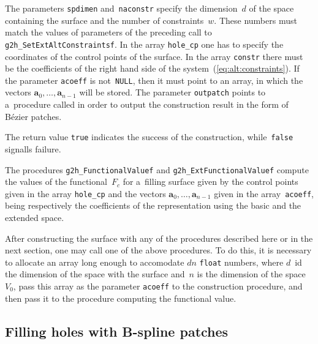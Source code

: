 The parameters \texttt{spdimen} and~\texttt{naconstr} specify the dimension~$d$
of the space containing the surface and the number of constraints~$w$.
These numbers must match the values of parameters of the preceding call to
\texttt{g2h\_SetExtAltConstraintsf}. In the array \texttt{hole\_cp} one has
to specify the coordinates of the control points of the surface.
In the array \texttt{constr} there must be the coefficients of the right hand side
of the system~(\ref{eq:alt:constraints}). If the parameter \texttt{acoeff} is
not~\texttt{NULL}, then it must point to an array, in which the vectors
$\bm{a}_0,\ldots,\bm{a}_{n-1}$ will be stored.
The parameter \texttt{outpatch} points to a~procedure called in order to
output the construction result in the form of B\'{e}zier patches.

The return value \texttt{true} indicates the success of the construction,
while~\texttt{false} signalls failure.

\vspace{\bigskipamount}
The procedures \texttt{g2h\_FunctionalValuef} and \texttt{g2h\_ExtFunctionalValuef}
compute the values of the functional~$F_c$ for a~filling surface
given by the control points given in the array \texttt{hole\_cp}
and the vectors $\bm{a}_0,\ldots,\bm{a}_{n-1}$ given in the array~\texttt{acoeff},
being respectively the coefficients of the representation
using the basic and the extended space.

After constructing the surface with any of the procedures described here or in
the next section, one may call one of the above procedures. To do this, it is
necessary to allocate an array long enough to accomodate $dn$ \texttt{float}
numbers, where $d$~id the dimension of the space with the surface
and~$n$ is the dimension of the space~$V_0$, pass this array as the
parameter \texttt{acoeff} to the construction procedure, and then
pass it to the procedure computing the functional value.


\subsection{Filling holes with B-spline patches}

